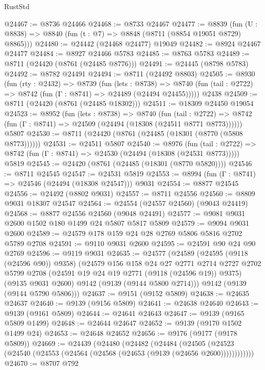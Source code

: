\begin{lexlean}{RustStd}
\begin{coremodule}
@24467 := @8736 @24466
@24468 := @8733 @24467
@24477 := @8839
    (fun (U : @8838) => @8840 (fun (t : @7) => @8848 (@8711 (@8854 @19051 @8729) @8865)))
@24480 := @24442 (@24468 @24477) @19049
@24482 := @8924 @24467 @24477
@24484 := @8927 @24466 @5783
@24485 := @8763 @5783
@24489 := @8711 (@24420 (@8761 (@24485 @8776)))
@24491 := @24445 (@8798 @5783)
@24492 := @8782 @24491
@24494 := @8711 (@24492 @8803)
@24505 := @8930
    (fun (rty : @2432) =>
    @8739
      (fun (lets : @8738) =>
      @8740 (fun (tail : @2722) => @8742 (fun (Γ : @8741) => @24489 (@24494 @24455)))))
    @2438
@24509 := @8711 (@24420 (@8761 (@24485 @18302)))
@24511 := @18309 @24450 @19054
@24523 := @8952
    (fun (lets : @8738) =>
    @8740
      (fun (tail : @2722) =>
      @8742 (fun (Γ : @8741) => @24509 (@24494 (@18308 (@24511 @8771 @8773))))))
    @5807
@24530 := @8711 (@24420 (@8761 (@24485 (@18301 (@8770 (@5808 @8773))))))
@24531 := @24511 @5807
@24540 := @8976
    (fun (tail : @2722) => @8742 (fun (Γ : @8741) => @24530 (@24494 (@18308 (@24531 @8773)))))
    @5819
@24545 := @24420 (@8761 (@24485 (@18301 (@8770 @5820))))
@24546 := @8711 @24545
@24547 := @24531 @5819
@24553 := @8994 (fun (Γ : @8741) => @24546 (@24494 (@18308 @24547))) @9031
@24554 := @8877 @24545
@24556 := @24492 (@8802 @9031)
@24557 := @8711 @24556
@24560 := @8809 @9031 @18307 @24547
@24564 := @24554 (@24557 @24560) (@9043 @24419)
@24568 := @8877 @24556 @24560 (@9048 @24491)
@24577 := @9081 @9031 @2600 @1502 @180 @1499 @24 @5807 @5817 @5809
@24579 := @9094 @9031 @2600
@24589 := @24579 @178 @159 @24 @28 @2769 @5806 @5816 @2702 @5789 @2708
@24591 := @9110 @9031 @2600
@24595 := @24591 @90 @24 @90 @2769
@24596 := @9119 @9031
@24635 := @24577
    (@24589
      (@24595 (@9118 (@24596 @90)) @9358)
      (@24579
        @156
        @158
        @24
        @27
        @2771
        @2714
        @2727
        @2702
        @5799
        @2708
        (@24591 @19 @24 @19 @2771 (@9118 (@24596 @19)) @9375)
        (@9135 @9031 @2600)
        @9142
        (@9139 (@9144 @5800 @2714)))
      @9142
      (@9139 (@9144 @5790 @5806)))
@24637 := @9151 (@9152 @5809)
@24638 := @24635 @24637
@24640 := @9139 (@9156 @5809)
@24641 := @24638 @24640
@24643 := @9139 (@9161 @5809)
@24644 := @24641 @24643
@24647 := @9139 (@9165 @5809 @1499)
@24648 := @24644 @24647
@24652 := @9139 (@9170 @1502 @1499 @24)
@24653 := @24648 @24652
@24656 := @9176 (@9177 (@9178 @5809))
@24669 := @24439
    (@24480
      (@24482
        (@24484
          (@24505 (@24523 (@24540 (@24553 (@24564 (@24568 (@24653 (@9139 (@24656 @2600))))))))))))
@24670 := @8707 @792

\end{coremodule}
\end{lexlean}
